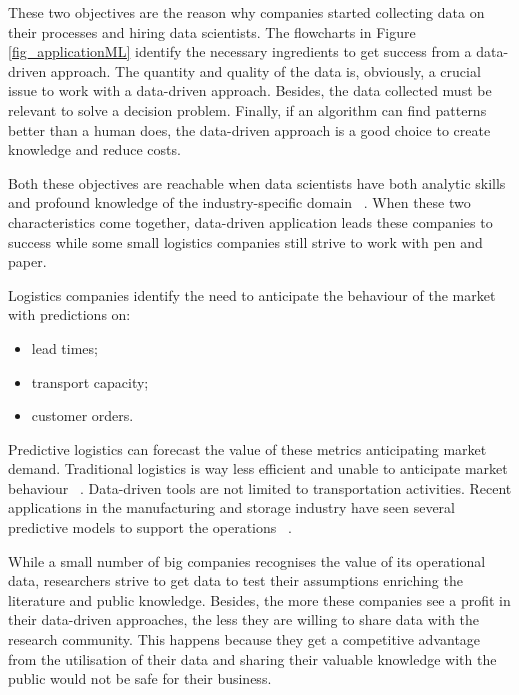 These two objectives are the reason why companies started collecting data on their processes and hiring data scientists. The flowcharts in Figure \ref{fig_applicationML} identify the necessary ingredients to get success from a data-driven approach. The quantity and quality of the data is, obviously, a crucial issue to work with a data-driven approach. Besides, the data collected must be relevant to solve a decision problem. Finally, if an algorithm can find patterns better than a human does, the data-driven approach is a good choice to create knowledge and reduce costs.\par

Both these objectives are reachable when data scientists have both analytic skills and profound knowledge of the industry-specific domain ~\cite{Ku2018}. When these two characteristics come together, data-driven application leads these companies to success while some small logistics companies still strive to work with pen and paper.

Logistics companies identify the need to anticipate the behaviour of the market with predictions on:

\begin{itemize}
    \item lead times;
    \item transport capacity;
    \item customer orders. 

\end{itemize}

Predictive logistics can forecast the value of these metrics anticipating market demand. Traditional logistics is way less efficient and unable to anticipate market behaviour ~\cite{LOGISTICAEFFICIENTE2019}. Data-driven tools are not limited to transportation activities.  Recent applications in the manufacturing and storage industry have seen several predictive models to support the operations ~\cite{Logisticofthings2017, Package.ai2017, Reporter2016}.\par

While a small number of big companies recognises the value of its operational data, researchers strive to get data to test their assumptions enriching the literature and public knowledge. Besides, the more these companies see a profit in their data-driven approaches, the less they are willing to share data with the research community. This happens because they get a competitive advantage from the utilisation of their data and sharing their valuable knowledge with the public would not be safe for their business.\par

